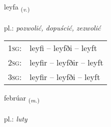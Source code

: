 \documentclass[frontgrid, backgrid]{flacards}\usepackage[]{graphicx}\usepackage[]{xcolor}
\begin{document}
\renewcommand{\flhead}{\vskip5pt \fboxsep=0pt {\small\bfseries\footnotesize Sagnorð | czasownik}}
\renewcommand{\fcfoot}{\vskip5pt \fboxsep=0pt \hspace{2pt}{\small\bfseries\footnotesize 1K}}

\renewcommand{\blhead}{\vskip5pt {\small\bfseries\footnotesize Sagnorð | czasownik }}
\renewcommand{\bcfoot}{\vskip5pt \hspace{2pt}{\small\bfseries\footnotesize 1K}}


{leyfa \small{\textsubscript{(\textit{v.})}} \\[1ex] %
\textphonetic{[leiːva]} \\
pl.: \emph{pozwolić, dopuścić, zezwolić} \\  [2ex]
\renewcommand*{\arraystretch}{0.8}
\begin{tabular}{p{1cm}l}
\textsc{1sg}: & leyfi -- leyfði -- leyft \\ 
\textsc{2sg}: & leyfir -- leyfðir -- leyft \\ 
\textsc{3sg}: & leyfir -- leyfði -- leyft \\ 
\end{tabular}
}

\renewcommand{\flhead}{\vskip5pt \fboxsep=0pt {\small\bfseries\footnotesize Nafnorð | rzeczownik}}
\renewcommand{\fcfoot}{\vskip5pt \fboxsep=0pt \hspace{2pt}{\small\bfseries\footnotesize 1K}}

\renewcommand{\blhead}{\vskip5pt {\small\bfseries\footnotesize Nafnorð | rzeczownik }}
\renewcommand{\bcfoot}{\vskip5pt \hspace{2pt}{\small\bfseries\footnotesize 1K}}


{febrúar \small{\textsubscript{(\textit{m.})}} \\[1ex] %
\textphonetic{[fɛːpruar]} \\
pl.: \emph{luty} \\  [2ex]
\renewcommand*{\arraystretch}{0.8}
}
\end{document}
